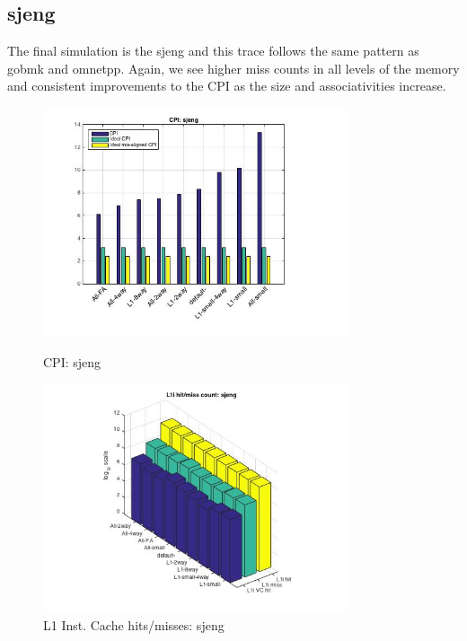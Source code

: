 \documentclass[11pt,titlepage]{article}
\begin{document}
    \subsection{sjeng}
    The final simulation is the sjeng and this trace follows the same pattern as gobmk and omnetpp. Again, we see higher miss counts in all levels of the memory and consistent improvements to the CPI as the size and associativities increase.
        \begin{figure}[H]
      \centering
      \begin{minipage}{.45\textwidth}
      \includegraphics[width=9cm]{CPIsjeng}
      \caption{CPI: sjeng}
      \label{fig:CPIsjeng}
      \end{minipage}
      \begin{minipage}{.45\textwidth}
            \includegraphics[width=9cm]{L1IHM_sjeng}
            \caption{L1 Inst. Cache hits/misses: sjeng}
            \label{fig:L1IHM_sjeng}
          \end{minipage}%
           \end{figure}
\end{document}
